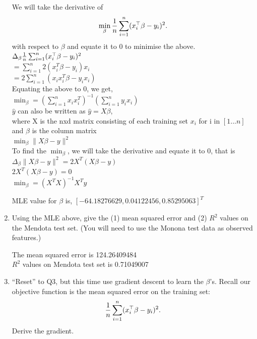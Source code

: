 \documentclass[a4paper]{article}
\theoremstyle{definition}
\newenvironment{soln}{
    \leavevmode\color{blue}\ignorespaces
}{}
\begin{document}
\begin{enumerate}
\begin{soln}
We will take the derivative of $$\min_\beta {1\over n} \sum_{i=1}^n (x_i^\top \beta - y_i)^2.$$ with respect to $\beta$ and equate it to 0 to minimise the above.\\
$\Delta_\beta {1\over n} \sum_{i=1}^n (x_i^\top \beta - y_i)^2$\\
$ = \sum_{i=1}^{n}2(x_i^T \beta - y_i)x_i$\\
$ = 2 \sum_{i=1}^{n}(x_ix_i^T \beta - y_ix_i)$\\
Equating the above to 0, we get, \\
$\min_\beta = (\sum_{i=1}^{n}x_ix_i^T)^{-1}(\sum_{i=1}^{n}y_ix_i)$\\


$\hat y$ can also be written as $\hat y = X\beta$,\\
where X is the nxd matrix consisting of each training set $x_i$ for i in $[1...n]$ and $\beta$ is the column matrix\\
$\min_\beta \|X\beta - y\|^2$\\
To find the $\min_\beta$, we will take the derivative and equate it to 0, that is\\
$\Delta_\beta \|X\beta - y\|^2 = 2X^T(X\beta - y) $\\
$2X^T(X\beta - y) = 0$\\
$\min_\beta = (X^TX)^{-1}X^Ty$

MLE value for $\beta$ is, $[-64.18276629, 0.04122456, 0.85295063]^T$

\end{soln}



\item
Using the MLE above, give the (1) mean squared error and (2) $R^2$ values on the Mendota test set.
(You will need to use the Monona test data as observed features.)

\begin{soln}
The mean squared error is 124.26409484\\
$R^2$ values on Mendota test set is 0.71049007
\end{soln}


\item
``Reset'' to Q3, but this time use gradient descent to learn the $\beta$'s.
Recall our objective function is the mean squared error on the training set:
$${1\over n} \sum_{i=1}^n (x_i^\top \beta - y_i)^2.$$
Derive the gradient.


\end{enumerate}
\end{document}
